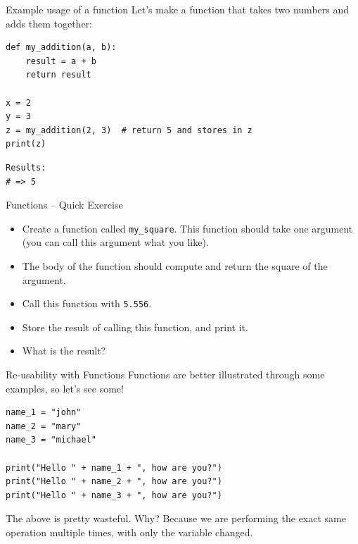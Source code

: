 \documentclass[10pt]{beamer}
\begin{document}
\begin{frame}[label={sec:org0ef89e5},fragile]{Example usage of a function}
 Let's make a function that takes two numbers and adds them together:

\begin{verbatim}
def my_addition(a, b):
    result = a + b
    return result

x = 2
y = 3
z = my_addition(2, 3)  # return 5 and stores in z
print(z)
\end{verbatim}

\begin{verbatim}
Results: 
# => 5
\end{verbatim}
\end{frame}

\begin{frame}[label={sec:orgb910339},fragile]{Functions -- Quick Exercise}
 \begin{itemize}
\item Create a function called \texttt{my\_square}. This function should take one argument (you can
call this argument what you like).
\item The body of the function should compute and return the square of the argument.
\item Call this function with \texttt{5.556}.
\item Store the result of calling this function, and print it.
\item What is the result?
\end{itemize}
\end{frame}

\begin{frame}[label={sec:org9dc36b6},fragile]{Re-usability with Functions}
 Functions are better illustrated through some examples, so let's see some!

\begin{verbatim}
name_1 = "john"
name_2 = "mary"
name_3 = "michael"

print("Hello " + name_1 + ", how are you?")
print("Hello " + name_2 + ", how are you?")
print("Hello " + name_3 + ", how are you?")
\end{verbatim}

The above is pretty wasteful. Why? Because we are performing the exact same
operation multiple times, with only the variable changed.
\end{frame}
\end{document}
